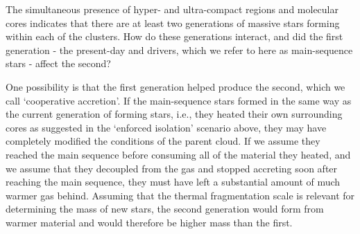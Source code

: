 \documentclass{emulateapj}
\begin{document}

The simultaneous presence of hyper- and ultra-compact \hii regions and
molecular cores indicates that there are at least two generations of massive
stars forming within each of the clusters.  How do these generations interact,
and did the first generation - the present-day \hchii and \uchii drivers, which
we refer to here as main-sequence stars - affect the second?

One possibility is that the first generation helped produce the second,
which we call `cooperative accretion'.
If the main-sequence stars formed in the same way as the current generation of
forming stars, i.e., they heated their own surrounding cores as suggested in
the `enforced isolation' scenario above, they may have completely modified the
conditions of the parent cloud.  If we assume they reached the main sequence
before consuming all of the material they heated, and we assume that they
decoupled from the gas and stopped accreting soon after reaching the main
sequence, they must have left a substantial amount of much warmer gas behind.
Assuming that the thermal fragmentation scale is relevant for determining
the mass of new stars, the second generation would form from warmer material
and would therefore be higher mass than the first.

\end{document}
